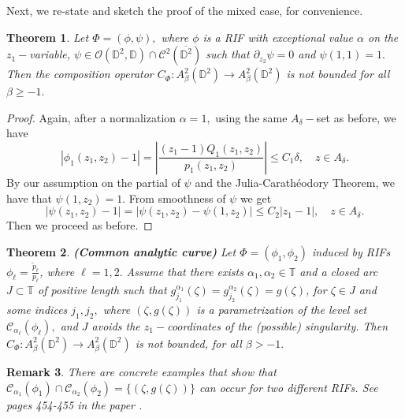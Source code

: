 \documentclass[12pt]{amsart}
\newtheorem{theorem}{Theorem}[section]
\newtheorem{remark}[theorem]{Remark}
\numberwithin{equation}{section}
\begin{document}
Next, we re-state and sketch the proof of the mixed case, for convenience.
\begin{theorem} Let $\Phi=(\phi,\psi),$ where $\phi$ is a RIF with exceptional value $\alpha$ on the $z_1-$variable, $\psi\in \mathcal{O}(\mathbb{D}^2,\mathbb{D})\cap \mathcal{C}^2(\overline{\mathbb{D}^2})$ such that $\partial_{z_2}\psi=0$ and $\psi(1,1)=1.$ Then the composition operator $C_{\Phi}:A^2_{\beta}(\mathbb{D}^2)\to A^2_{\beta}(\mathbb{D}^2)$ is not bounded for all $\beta\ge-1.$
\end{theorem}
\begin{proof} Again, after a normalization $\alpha=1,$ using the same $A_{\delta}-$set as before, we have
$$|\phi_1(z_1,z_2)-1|=\left|\frac{(z_1-1)Q_1(z_1,z_2)}{p_1(z_1,z_2)}\right|\leq C_1\delta, \quad z\in A_{\delta}.$$
By our assumption on the partial of $\psi$ and the Julia-Carath\'eodory Theorem, we have that $\psi(1,z_2)=1.$ From smoothness of $\psi$ we get
$$|\psi(z_1,z_2)-1|=|\psi(z_1,z_2)-\psi(1,z_2)|\leq C_2|z_1-1|,\quad z\in A_{\delta}.$$
Then we proceed as before.
\end{proof}
\begin{theorem}\textbf{(Common analytic curve)} Let $\Phi=(\phi_1,\phi_2)$ induced by RIFs $\phi_\ell=\frac{\widetilde{p}_\ell}{p_\ell}$, where $\ell=1,2.$
Assume that there exists  $\alpha_1,\alpha_2\in\mathbb{T}$ and a closed arc $J\subset \mathbb{T}$ of positive length such that $g^{\alpha_1}_{j_1}(\zeta)=g^{\alpha_2}_{j_2}(\zeta)=g(\zeta)$, for $\zeta\in J$ and some indices $j_1,j_2,$ where $(\zeta,g(\zeta))$ is a parametrization of the level set $\mathcal{C}_{\alpha_\ell}(\phi_\ell),$ and $J$ avoids the $z_1-$coordinates of the (possible) singularity. Then $C_{\Phi}:A^2_{\beta}(\mathbb{D}^2)\to A^2_{\beta}(\mathbb{D}^2)$ is not bounded, for all $\beta>-1.$
\end{theorem}
\begin{remark} There are concrete examples that show that $\mathcal{C}_{\alpha_1}(\phi_1)\cap\mathcal{C}_{\alpha_2}(\phi_2)=\{(\zeta,g(\zeta))\}$ can occur for two different RIFs. See pages 454-455 in the paper \cite{Pisa}.
\end{remark}
\end{document}
